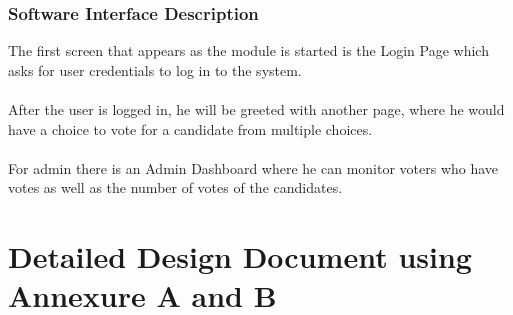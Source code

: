 \documentclass[oneside, 12pt]{book}
\begin{document}
			\subsubsection{Software Interface Description}
				The first screen that appears as the module is started is the Login Page which asks for user credentials to log in to the system. 
				\\\\After the user is logged in, he will be greeted with another page, where he would have a choice to vote for a candidate from multiple choices.
				\\\\For admin there is an Admin Dashboard where he can monitor voters who have votes as well as the number of votes of the candidates.
	\newpage	
	\section{Detailed Design Document using Annexure A and B}
	\newpage
\end{document}
